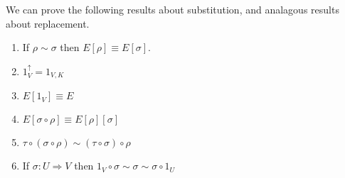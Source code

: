 \documentclass[envcountsame]{llncs}
\begin{document}

We can prove the following results about substitution, and analagous results about replacement.
\begin{lemma}
 \begin{enumerate}
  \item If $\rho \sim \sigma$ then $E [ \rho ] \equiv E [ \sigma ]$.
  \item  $1_V^\uparrow = 1_{V, K}$
  \item $E [ 1_V ] \equiv E$
  \item $E [ \sigma \circ \rho ] \equiv E [ \rho ] [ \sigma ]$
  \item $\tau \circ (\sigma \circ \rho) \sim (\tau \circ \sigma) \circ \rho$
  \item If $\sigma : U \Rightarrow V$ then $1_V \circ \sigma \sim \sigma \sim \sigma \circ 1_U$
 \end{enumerate}
\end{lemma}

% 
% 
% 
% 
\end{document}
